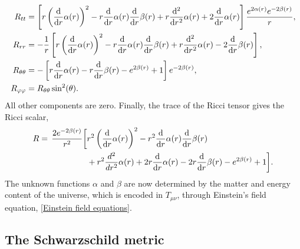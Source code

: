 \begin{align}
    \label{tt component ricci tensor}
    R_{tt}
    & =
    \left[
        r \left(\odv{}{r} \alpha{\left(r \right)}\right)^{2} 
        - r \odv{}{r} \alpha{\left(r \right)} \odv{}{r} \beta{\left(r \right)} 
        + r \odv[2]{}{r} \alpha{\left(r \right)} 
        + 2 \odv{}{r} \alpha{\left(r \right)}
    \right]
    \frac{
         e^{2 \alpha{\left(r \right)}} e^{- 2 \beta{\left(r \right)}}}{r}, \\
    \label{rr component ricci tensor}
    R_{rr}
    & =
    - \frac{1}{r}
    \left[
        r \left(\odv{}{r} \alpha{\left(r \right)}\right)^{2} 
        - r \odv{}{r} \alpha{\left(r \right)} \odv{}{r} \beta{\left(r \right)} 
        + r \odv[2]{}{r} \alpha{\left(r \right)} - 2 \odv{}{r} \beta{\left(r \right)} 
    \right],\\
    \label{thetatheta component ricci tensor}
    R_{\theta \theta}
    &=
    -  
    \left[
        r \odv{}{r} \alpha{\left(r \right)} - r \odv{}{r} \beta{\left(r \right)} - e^{2 \beta{\left(r \right)}} + 1
    \right]
        e^{- 2 \beta{\left(r \right)}}, \\
    R_{\varphi \varphi} & = R_{\theta \theta} \sin^2( \theta).
\end{align}
%
All other components are zero.
Finally, the trace of the Ricci tensor gives the Ricci scalar,
%
\begin{align}
    \nonumber
    R =
    \, \frac{2 e^{- 2 \beta{\left(r \right)}}}{r^{2}}
    \bigg[
        &
        r^{2} \left(\odv{}{r} \alpha{\left(r \right)}\right)^{2} 
        - r^{2} \odv{}{r} \alpha{\left(r \right)} \odv{}{r} \beta{\left(r \right)}
        \\ &
        + r^{2} \frac{d^{2}}{d r^{2}} \alpha{\left(r \right)} 
        + 2 r \odv{}{r} \alpha{\left(r \right)} 
        - 2 r \odv{}{r} \beta{\left(r \right)} - e^{2 \beta{\left(r \right)}} + 1
    \bigg].
\end{align}
%
 The unknown functions $\alpha$ and $\beta$ are now determined by the matter and energy content of the universe, which is encoded in $T_{\mu \nu}$, through Einstein's field equation, \autoref{Einstein field equations}. 



\subsection{The Schwarzschild metric}


